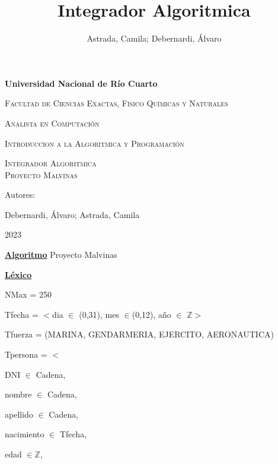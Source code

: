 \documentclass{article}
\title{Integrador Algoritmica}
\author{Astrada, Camila; Debernardi, Álvaro}
\begin{document}
    \begin{titlepage}
        \centering
        {\bfseries\LARGE Universidad Nacional de Río Cuarto \par}
        \vspace{1cm}
        {\scshape\Large Facultad de Ciencias Exactas, Físico Químicas y Naturales \par}
        {\scshape\Large Analista en Computación \par}
        {\scshape\Large Introduccion a la Algoritmica y Programación\par}
        \vspace{3cm}
        {\scshape\Huge Integrador Algoritmica \\ Proyecto Malvinas\par}
        \vspace{3cm}
        \vfill
        {\Large Autores: \par}
        {\Large Debernardi, Álvaro; Astrada, Camila\par}
        \vfill
        {\Large 2023 \par} 
    \end{titlepage}

    \underline{\textbf{Algoritmo}} Proyecto Malvinas

    \underline{\textbf{Léxico}}

    \hspace{4mm}NMax = 250

    \hspace{4mm}Tfecha = $<$dia $\in$ (0,31), mes $\in$(0,12), año $\in$ $\mathbb{Z}>$

    \hspace{4mm}Tfuerza = (MARINA, GENDARMERIA, EJERCITO, AERONAUTICA)

    \hspace{4mm}Tpersona = $<$
    
        \hspace{8mm}DNI $\in$ Cadena, 
        
        \hspace{8mm}nombre $\in$ Cadena, 
        
        \hspace{8mm}apellido $\in$ Cadena, 
        
        \hspace{8mm}nacimiento $\in$ Tfecha, 
        
        \hspace{8mm}edad $\in \mathbb{Z}$, 
        
\end{document}
